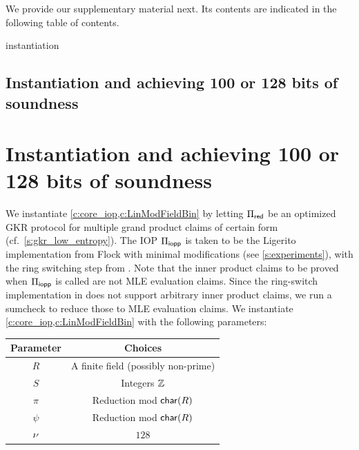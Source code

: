 We provide our supplementary material next. Its contents are indicated in the following table of contents. 
\bigskip 

\lncsappendixtoc
\fi
\iflncs\lncsfittables\fi
{}

\begin{lncsappendix}{instantiation}
\iflncs\subsection{Instantiation and achieving 100 or 128 bits of soundness}\label{s:instantiation}\else\section{Instantiation and achieving 100 or 128 bits of soundness}\label{s:instantiation}\fi
We instantiate \cref{c:core_iop,c:LinModFieldBin} by letting $\Pi_{\mathsf{red}}$ be an optimized GKR protocol for multiple grand product claims of certain form (cf.\ \cref{s:gkr_low_entropy}). The IOP $\Pi_{\mathsf{iopp}}$ is taken to be the Ligerito \cite{Ligerito} implementation from Flock \cite{flock} with minimal modifications (see \cref{s:experiments}), with the ring switching step from \cite{binius2}. Note that the inner product claims to be proved when $\Pi_{\mathsf{iopp}}$ is called are not MLE evaluation claims. Since  the ring-switch implementation in \cite{flock} does not support arbitrary inner product claims,  we run a sumcheck to reduce those to MLE evaluation claims.  We instantiate \cref{c:core_iop,c:LinModFieldBin} with the following parameters:
\begin{table}[H]
    \centering
    \begin{tabular}{c|c}
        Parameter & Choices \\
        \hline\hline
        $R$ & A finite field (possibly non-prime)\\
        \hline
        $S$ &  Integers $\mathbb{Z}$\\
        \hline
        $\pi$ & Reduction mod $\mathsf{char}(R)$\\
        \hline
        $\psi$ & Reduction mod $\mathsf{char}(R)$\\
        \hline
        $\nu$ & $128$\\

\end{tabular}
\end{table}
\end{lncsappendix}
